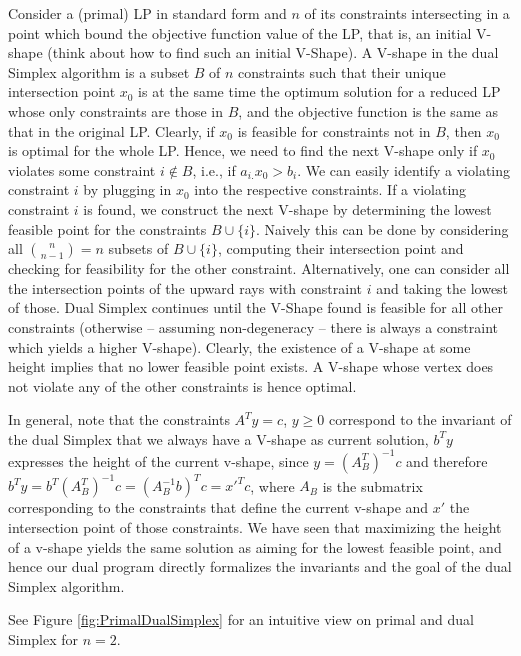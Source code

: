 \documentclass{article}
\begin{document}
Consider a (primal) LP in standard form and $n$ of its constraints intersecting in a point which bound the objective function value of the LP, that is, an initial V-shape (think about how to find such an initial V-Shape).
A V-shape in the dual Simplex algorithm is a subset $B$ of $n$ constraints such that their unique intersection point $x_0$ is at the same time the optimum solution for a reduced LP whose only constraints are those in $B$, and the objective function is the same as that in the original LP. 
Clearly, if $x_0$ is feasible for constraints not in $B$, then $x_0$ is optimal for the whole LP.
Hence, we need to find the next V-shape only if $x_0$ violates some constraint $i \notin B$, i.e., if $a_{i.}x_0 > b_i$.
We can easily identify a violating constraint $i$ by plugging in $x_0$ into the respective constraints. If a violating constraint $i$ is found, we construct the next V-shape by determining the lowest feasible point for the constraints $B\cup \{i\}$. Naively this can be done by considering all ${n\choose n-1} =n$ subsets of $B\cup\{i\}$, computing their intersection point and checking for feasibility for the other constraint. Alternatively, one can consider all the intersection points of the upward rays with constraint $i$ and taking the lowest of those.
Dual Simplex continues until the V-Shape found is feasible for all other constraints (otherwise -- assuming non-degeneracy -- there is always a constraint which yields a higher V-shape). Clearly, the existence of a V-shape at some height implies that no lower feasible point exists. A V-shape whose vertex does not violate any of the other constraints is hence optimal.
 

In general, note that the constraints $A^Ty=c$, $y\geq 0$ correspond to the invariant of the dual Simplex that we always have a V-shape as current solution, $b^Ty$ expresses the height of the current v-shape, since $y=(A_B^T)^{-1}c$ and therefore $b^Ty=b^T(A_B^T)^{-1}c=(A_B^{-1}b)^Tc = x'^T c$, where $A_B$ is the submatrix corresponding to the constraints that define the current v-shape and $x'$ the intersection point of those constraints. We have seen that maximizing the height of a v-shape yields the same solution as aiming for the lowest feasible point, and hence our dual program directly formalizes the invariants and the goal of the dual Simplex algorithm.

See Figure \ref{fig:PrimalDualSimplex} for an intuitive view on primal and dual Simplex for $n=2$.
\end{document}
